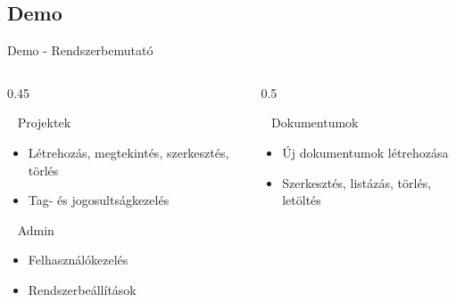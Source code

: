 \documentclass[aspectratio=169, 11pt]{beamer}
\begin{document}
\subsection{Demo}
\begin{frame}{Demo - Rendszerbemutató}
\vspace{-1.5em}
  \begin{columns}[T]
    \begin{column}{0.45\textwidth}
      \begin{block}{\faUsers~ Projektek}
        \begin{itemize}
          \item Létrehozás, megtekintés, szerkesztés, törlés
          \item Tag- és jogosultságkezelés
        \end{itemize}
      \end{block}
      
      \begin{block}{\faUserShield~ Admin}
        \begin{itemize}
          \item Felhasználókezelés
          \item Rendszerbeállítások
        \end{itemize}
      \end{block}
    \end{column}
    
    \begin{column}{0.5\textwidth}
      \begin{block}{\faFileMedical~ Dokumentumok}
        \begin{itemize}
          \item Új dokumentumok létrehozása
          \item Szerkesztés, listázás, törlés, letöltés
        \end{itemize}
      \end{block}
      

\end{column}
\end{columns}
\end{frame}
\end{document}
